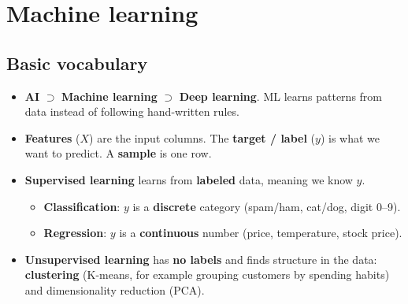 \newpage
\section{Machine learning}

\subsection{Basic vocabulary}
\begin{itemize}
  \item \textbf{AI} $\supset$ \textbf{Machine learning} $\supset$ \textbf{Deep learning}. ML learns patterns from data instead of following hand-written rules.
  \item \textbf{Features} ($X$) are the input columns. The \textbf{target / label} ($y$) is what we want to predict. A \textbf{sample} is one row.
  \item \textbf{Supervised learning} learns from \textbf{labeled} data, meaning we know $y$.
  \begin{itemize}
    \item \textbf{Classification}: $y$ is a \textbf{discrete} category (spam/ham, cat/dog, digit 0--9).
    \item \textbf{Regression}: $y$ is a \textbf{continuous} number (price, temperature, stock price).
  \end{itemize}
  \item \textbf{Unsupervised learning} has \textbf{no labels} and finds structure in the data: \textbf{clustering} (K-means, for example grouping customers by spending habits) and dimensionality reduction (PCA).
\end{itemize}

